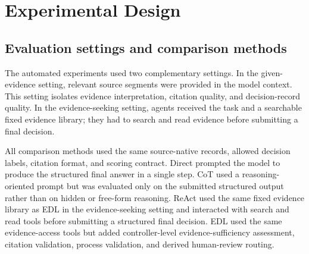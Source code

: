 \documentclass[11pt,a4paper]{article}
\begin{document}
\section{Experimental Design}

\subsection{Evaluation settings and comparison methods}

The automated experiments used two complementary settings. In the given-evidence setting, relevant source segments were provided in the model context. This setting isolates evidence interpretation, citation quality, and decision-record quality. In the evidence-seeking setting, agents received the task and a searchable fixed evidence library; they had to search and read evidence before submitting a final decision.

All comparison methods used the same source-native records, allowed decision labels, citation format, and scoring contract. Direct prompted the model to produce the structured final answer in a single step. CoT used a reasoning-oriented prompt but was evaluated only on the submitted structured output rather than on hidden or free-form reasoning. ReAct used the same fixed evidence library as EDL in the evidence-seeking setting and interacted with search and read tools before submitting a structured final decision. EDL used the same evidence-access tools but added controller-level evidence-sufficiency assessment, citation validation, process validation, and derived human-review routing.

\begin{table}[H]
\centering
\caption{Comparison methods.}
\end{table}
\end{document}
